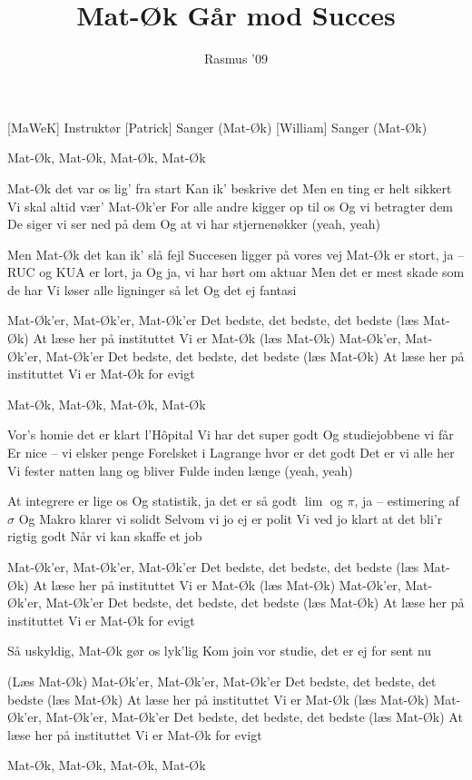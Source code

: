 \documentclass[a4paper,11pt]{article}
\title{Mat-Øk Går mod Succes}
\author{Rasmus '09}
\begin{document}
\maketitle

\begin{roles}
[MaWeK] Instruktør
[Patrick] Sanger (Mat-Øk)
[William] Sanger (Mat-Øk)
\end{roles}

\begin{song}
 Mat-Øk, Mat-Øk, Mat-Øk, Mat-Øk

 Mat-Øk det var os lig' fra start
Kan ik' beskrive det
Men en ting er helt sikkert
 Vi skal altid vær' Mat-Øk'er
 For alle andre kigger op til os
Og vi betragter dem
De siger vi ser ned på dem
 Og at vi har stjernenøkker (yeah, yeah)

 Men Mat-Øk det kan ik' slå fejl
Succesen ligger på vores vej
 Mat-Øk er stort, ja -- RUC og KUA er lort, ja
 Og ja, vi har hørt om aktuar
Men det er mest skade som de har
Vi løser alle ligninger så let
Og det ej fantasi

 Mat-Øk'er, Mat-Øk'er, Mat-Øk'er
Det bedste, det bedste, det bedste (læs Mat-Øk)
At læse her på instituttet
Vi er Mat-Øk (læs Mat-Øk)
Mat-Øk'er, Mat-Øk'er, Mat-Øk'er
Det bedste, det bedste, det bedste (læs Mat-Øk)
At læse her på instituttet
Vi er Mat-Øk for evigt

 Mat-Øk, Mat-Øk, Mat-Øk, Mat-Øk

 Vor's homie det er klart l'Hôpital
Vi har det super godt
Og studiejobbene vi får
 Er nice -- vi elsker penge
 Forelsket i Lagrange hvor er det godt
Det er vi alle her
Vi fester natten lang og bliver
 Fulde inden længe (yeah, yeah)

 At integrere er lige os
Og statistik, ja det er så godt
 $\lim$ og $\pi$, ja -- estimering af $\sigma$
 Og Makro klarer vi solidt
Selvom vi jo ej er polit
Vi ved jo klart at det bli'r rigtig godt
Når vi kan skaffe et job

 Mat-Øk'er, Mat-Øk'er, Mat-Øk'er
Det bedste, det bedste, det bedste (læs Mat-Øk)
At læse her på instituttet
Vi er Mat-Øk (læs Mat-Øk)
Mat-Øk'er, Mat-Øk'er, Mat-Øk'er
Det bedste, det bedste, det bedste (læs Mat-Øk)
At læse her på instituttet
Vi er Mat-Øk for evigt

 Så uskyldig, Mat-Øk gør os lyk'lig
 Kom join vor studie, det er ej for sent nu

 (Læs Mat-Øk) Mat-Øk'er, Mat-Øk'er, Mat-Øk'er
Det bedste, det bedste, det bedste (læs Mat-Øk)
At læse her på instituttet
Vi er Mat-Øk (læs Mat-Øk)
Mat-Øk'er, Mat-Øk'er, Mat-Øk'er
Det bedste, det bedste, det bedste (læs Mat-Øk)
At læse her på instituttet
Vi er Mat-Øk for evigt

 Mat-Øk, Mat-Øk, Mat-Øk, Mat-Øk
\end{song}
\end{document}
